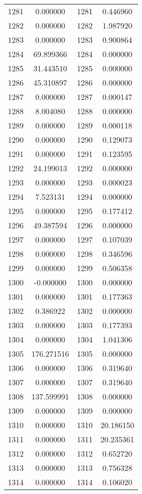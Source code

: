 \documentclass[12pt]{article}
\begin{document}
\begin{longtable}{@{}cccc@{}}
1281 & 0.000000 & 1281 & 0.446960 \\
1282 & 0.000000 & 1282 & 1.987920 \\
1283 & 0.000000 & 1283 & 0.900864 \\
1284 & 69.899366 & 1284 & 0.000000 \\
1285 & 31.443510 & 1285 & 0.000000 \\
1286 & 45.310897 & 1286 & 0.000000 \\
1287 & 0.000000 & 1287 & 0.000147 \\
1288 & 8.004080 & 1288 & 0.000000 \\
1289 & 0.000000 & 1289 & 0.000118 \\
1290 & 0.000000 & 1290 & 0.129073 \\
1291 & 0.000000 & 1291 & 0.123595 \\
1292 & 24.199013 & 1292 & 0.000000 \\
1293 & 0.000000 & 1293 & 0.000023 \\
1294 & 7.523131 & 1294 & 0.000000 \\
1295 & 0.000000 & 1295 & 0.177412 \\
1296 & 49.387594 & 1296 & 0.000000 \\
1297 & 0.000000 & 1297 & 0.107039 \\
1298 & 0.000000 & 1298 & 0.346596 \\
1299 & 0.000000 & 1299 & 0.506358 \\
1300 & -0.000000 & 1300 & 0.000000 \\
1301 & 0.000000 & 1301 & 0.177363 \\
1302 & 0.386922 & 1302 & 0.000000 \\
1303 & 0.000000 & 1303 & 0.177393 \\
1304 & 0.000000 & 1304 & 1.041306 \\
1305 & 176.271516 & 1305 & 0.000000 \\
1306 & 0.000000 & 1306 & 0.319640 \\
1307 & 0.000000 & 1307 & 0.319640 \\
1308 & 137.599991 & 1308 & 0.000000 \\
1309 & 0.000000 & 1309 & 0.000000 \\
1310 & 0.000000 & 1310 & 20.186150 \\
1311 & 0.000000 & 1311 & 20.235361 \\
1312 & 0.000000 & 1312 & 0.652720 \\
1313 & 0.000000 & 1313 & 0.756328 \\
1314 & 0.000000 & 1314 & 0.106020 \\

\end{longtable}
\end{document}

